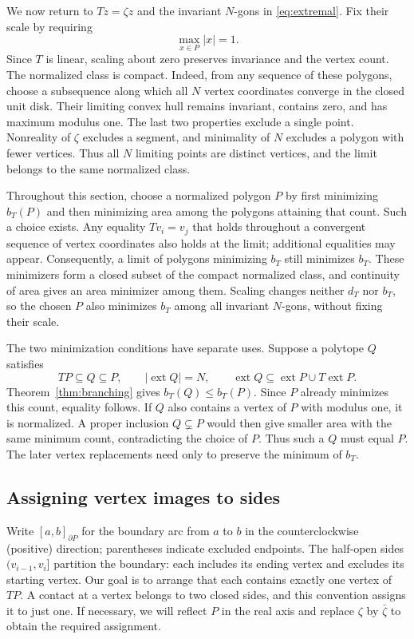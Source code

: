 \documentclass[11pt,a4paper]{article}
\DeclareMathOperator{\ext}{ext}
\theoremstyle{definition}
\theoremstyle{remark}
\numberwithin{equation}{section}
\begin{document}
We now return to $Tz=\zeta z$ and the invariant $N$-gons in \eqref{eq:extremal}. Fix their scale by requiring
\[
 \max_{x\in P}|x|=1.
\]
Since $T$ is linear, scaling about zero preserves invariance and the vertex count. The normalized class is compact. Indeed, from any sequence of these polygons, choose a subsequence along which all $N$ vertex coordinates converge in the closed unit disk. Their limiting convex hull remains invariant, contains zero, and has maximum modulus one. The last two properties exclude a single point. Nonreality of $\zeta$ excludes a segment, and minimality of $N$ excludes a polygon with fewer vertices. Thus all $N$ limiting points are distinct vertices, and the limit belongs to the same normalized class.

Throughout this section, choose a normalized polygon $P$ by first minimizing $b_T(P)$ and then minimizing area among the polygons attaining that count. Such a choice exists. Any equality $Tv_i=v_j$ that holds throughout a convergent sequence of vertex coordinates also holds at the limit; additional equalities may appear. Consequently, a limit of polygons minimizing $b_T$ still minimizes $b_T$. These minimizers form a closed subset of the compact normalized class, and continuity of area gives an area minimizer among them. Scaling changes neither $d_T$ nor $b_T$, so the chosen $P$ also minimizes $b_T$ among all invariant $N$-gons, without fixing their scale.

The two minimization conditions have separate uses. Suppose a polytope $Q$ satisfies
\[
 TP\subseteq Q\subseteq P,\qquad
 |\ext Q|=N,\qquad
 \ext Q\subseteq\ext P\cup T\ext P.
\]
Theorem~\ref{thm:branching} gives $b_T(Q)\le b_T(P)$. Since $P$ already minimizes this count, equality follows. If $Q$ also contains a vertex of $P$ with modulus one, it is normalized. A proper inclusion $Q\subsetneq P$ would then give smaller area with the same minimum count, contradicting the choice of $P$. Thus such a $Q$ must equal $P$. The later vertex replacements need only to preserve the minimum of $b_T$.

\subsection{Assigning vertex images to sides}
Write $[a,b]_{\partial P}$ for the boundary arc from $a$ to $b$ in the counterclockwise (positive) direction; parentheses indicate excluded endpoints. The half-open sides $(v_{i-1},v_i]$ partition the boundary: each includes its ending vertex and excludes its starting vertex. Our goal is to arrange that each contains exactly one vertex of $TP$. A contact at a vertex belongs to two closed sides, and this convention assigns it to just one. If necessary, we will reflect $P$ in the real axis and replace $\zeta$ by $\bar\zeta$ to obtain the required assignment.
\end{document}
